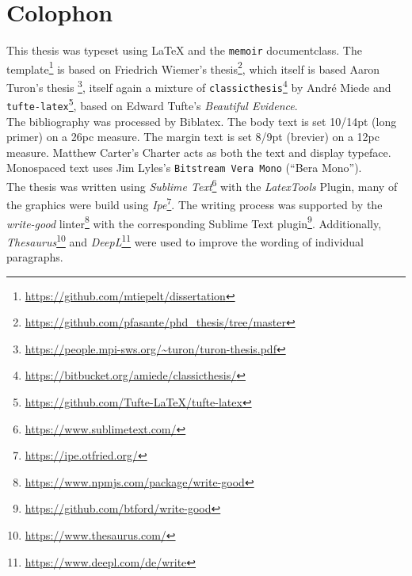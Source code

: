 
\pagestyle{empty}

\hfill

\vfill

\section*{Colophon}
%
\mparshift{40em} %
%
This thesis was typeset using \LaTeX{} and the \texttt{memoir} documentclass. 
The template\footnote{\url{https://github.com/mtiepelt/dissertation}} is based on Friedrich Wiemer's thesis\footnote{\url{https://github.com/pfasante/phd_thesis/tree/master}}, 
which itself is based Aaron Turon's thesis \footnote{\url{https://people.mpi-sws.org/~turon/turon-thesis.pdf}}, itself again a mixture of \texttt{classicthesis}\footnote{\url{https://bitbucket.org/amiede/classicthesis/}} by Andr\'e Miede and \texttt{tufte-latex}\footnote{\url{https://github.com/Tufte-LaTeX/tufte-latex}}, based on Edward Tufte's \emph{Beautiful Evidence}.\\[0.5\baselineskip]
%
The bibliography was processed by Biblatex.
%
The body text is set 10/14pt (long primer) on a 26pc measure.
The margin text is set 8/9pt (brevier) on a 12pc measure.
Matthew Carter's \textrm{Charter} acts as both the text and display typeface.
Monospaced text uses Jim Lyles's \texttt{Bitstream Vera Mono} (\enquote{Bera Mono}).\\[0.5\baselineskip]
%
The thesis was written using \emph{Sublime Text}\footnote{\url{https://www.sublimetext.com/}} with the \emph{LatexTools} Plugin, 
many of the graphics were build using \emph{Ipe}\footnote{\url{https://ipe.otfried.org/}}. 
%
The writing process was supported by the \emph{write-good} linter\footnote{\url{https://www.npmjs.com/package/write-good}} with the corresponding Sublime Text plugin\footnote{\url{https://github.com/btford/write-good}}.
%
Additionally, 
\emph{Thesaurus}\footnote{\url{https://www.thesaurus.com/}} and \emph{DeepL}\footnote{\url{https://www.deepl.com/de/write}} were used to improve the wording of individual paragraphs. 









